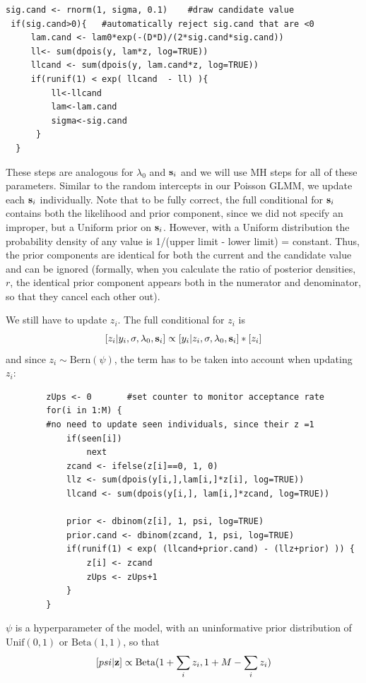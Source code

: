 \begin{verbatim}
sig.cand <- rnorm(1, sigma, 0.1)	#draw candidate value
 if(sig.cand>0){   #automatically reject sig.cand that are <0
     lam.cand <- lam0*exp(-(D*D)/(2*sig.cand*sig.cand))
     ll<- sum(dpois(y, lam*z, log=TRUE))
     llcand <- sum(dpois(y, lam.cand*z, log=TRUE))
     if(runif(1) < exp( llcand  - ll) ){
         ll<-llcand
         lam<-lam.cand
         sigma<-sig.cand
      }
  }
\end{verbatim}

These steps are analogous for  $\lambda_{0}$ and ${\bf s}_i$ and we will 
use MH steps for
all of these parameters. Similar to the random intercepts in our
Poisson GLMM, we update each ${\bf s}_i$ individually. Note that to be fully
correct, the full conditional for ${\bf s}_i$ contains both the likelihood and
prior component, since we did not specify an improper, but a Uniform
prior on ${\bf s}_i$. However, with a Uniform distribution the probability
density of any value is 1/(upper limit - lower limit) =
constant. Thus, the prior components are identical for both the
current and the candidate value and can be ignored (formally, when you
calculate the ratio of posterior densities, $r$, the identical prior
component appears both in the numerator and denominator, so that they
cancel each other out).

We still have to update $z_i$. The full conditional for $z_i$ is
\[
[z_i|y_{i}, \sigma, \lambda_0, {\bf s}_{i}] \propto [y_{i}|z_{i},\sigma, \lambda_0, 
{\bf s}_{i}] * [z_i]
\]
and since $z_i \sim \mbox{Bern}(\psi)$,
the term has to be taken into account when updating $z_i$:

\begin{verbatim}
        zUps <- 0		#set counter to monitor acceptance rate
        for(i in 1:M) {
        #no need to update seen individuals, since their z =1
            if(seen[i])	
                next
            zcand <- ifelse(z[i]==0, 1, 0)
            llz <- sum(dpois(y[i,],lam[i,]*z[i], log=TRUE))
            llcand <- sum(dpois(y[i,], lam[i,]*zcand, log=TRUE))

            prior <- dbinom(z[i], 1, psi, log=TRUE)
            prior.cand <- dbinom(zcand, 1, psi, log=TRUE)
            if(runif(1) < exp( (llcand+prior.cand) - (llz+prior) )) {
                z[i] <- zcand
                zUps <- zUps+1
            }
        }
\end{verbatim}

$\psi$
 is a hyperparameter of the model, with an uninformative prior 
 distribution of $\mbox{Unif}(0,1)$ or $\mbox{Beta}(1,1)$, so that
\[
[psi|{\bf z}] \propto \mbox{Beta}(1 + \sum_i z_i, 1 + M-\sum_i z_i)
\]


